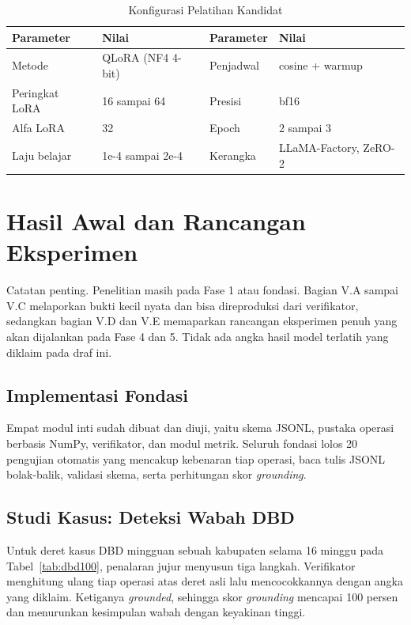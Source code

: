 \documentclass[10pt,a4paper,twocolumn]{article}
\begin{document}
\begin{table}[t]
\centering
\caption{Konfigurasi Pelatihan Kandidat}
\label{tab:latih}
\footnotesize
\begin{tabular}{@{}p{1.8cm}p{2.0cm}p{1.4cm}p{1.6cm}@{}}
\toprule
\textbf{Parameter} & \textbf{Nilai} & \textbf{Parameter} & \textbf{Nilai} \\
\midrule
Metode & QLoRA (NF4 4-bit) & Penjadwal & cosine + warmup \\
Peringkat LoRA & 16 sampai 64 & Presisi & bf16 \\
Alfa LoRA & 32 & Epoch & 2 sampai 3 \\
Laju belajar & 1e-4 sampai 2e-4 & Kerangka & LLaMA-Factory, ZeRO-2 \\
\bottomrule
\end{tabular}
\end{table}

\section{Hasil Awal dan Rancangan Eksperimen}
Catatan penting. Penelitian masih pada Fase 1 atau fondasi. Bagian V.A sampai
V.C melaporkan bukti kecil nyata dan bisa direproduksi dari verifikator,
sedangkan bagian V.D dan V.E memaparkan rancangan eksperimen penuh yang akan
dijalankan pada Fase 4 dan 5. Tidak ada angka hasil model terlatih yang diklaim
pada draf ini.

\subsection{Implementasi Fondasi}
Empat modul inti sudah dibuat dan diuji, yaitu skema JSONL, pustaka operasi
berbasis NumPy, verifikator, dan modul metrik. Seluruh fondasi lolos 20
pengujian otomatis yang mencakup kebenaran tiap operasi, baca tulis JSONL
bolak-balik, validasi skema, serta perhitungan skor \textit{grounding}.

\subsection{Studi Kasus: Deteksi Wabah DBD}
Untuk deret kasus DBD mingguan sebuah kabupaten selama 16 minggu pada
Tabel~\ref{tab:dbd100}, penalaran jujur menyusun tiga langkah. Verifikator
menghitung ulang tiap operasi atas deret asli lalu mencocokkannya dengan angka
yang diklaim. Ketiganya \textit{grounded}, sehingga skor \textit{grounding}
mencapai 100 persen dan menurunkan kesimpulan wabah dengan keyakinan tinggi.
\end{document}
